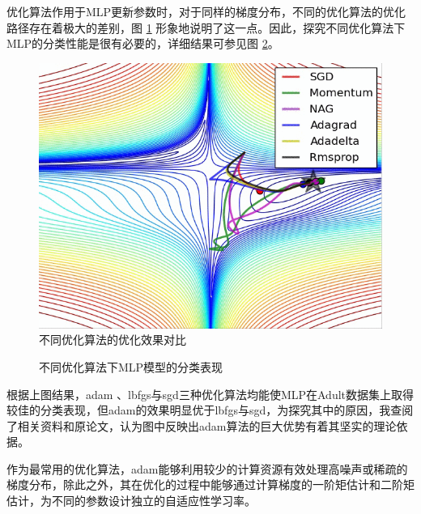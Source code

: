 \documentclass[12pt,a4paper]{article}
\theoremstyle{definition}
\begin{document}
优化算法作用于MLP更新参数时，对于同样的梯度分布，不同的优化算法的优化路径存在着极大的差别，图 \ref{fig:optim-ref} 形象地说明了这一点。因此，探究不同优化算法下MLP的分类性能是很有必要的，详细结果可参见图 \ref{fig:optim1}。

\begin{figure}[H]
	\centering
	\includegraphics[width=0.5\linewidth]{img/optim_example.png}
	\caption{不同优化算法的优化效果对比 \cite{optim_example}}
	\label{fig:optim-ref}
\end{figure}

\begin{figure}[H]
	\centering
	\caption{不同优化算法下MLP模型的分类表现}
	\label{fig:optim1}
\end{figure}

根据上图结果，adam \cite{adam}、lbfgs与sgd三种优化算法均能使MLP在Adult数据集上取得较佳的分类表现，但adam的效果明显优于lbfgs与sgd，为探究其中的原因，我查阅了相关资料和原论文，认为图中反映出adam算法的巨大优势有着其坚实的理论依据。

\vspace{0.01\linewidth}
作为最常用的优化算法，adam能够利用较少的计算资源有效处理高噪声或稀疏的梯度分布，除此之外，其在优化的过程中能够通过计算梯度的一阶矩估计和二阶矩估计，为不同的参数设计独立的自适应性学习率。
\end{document}
